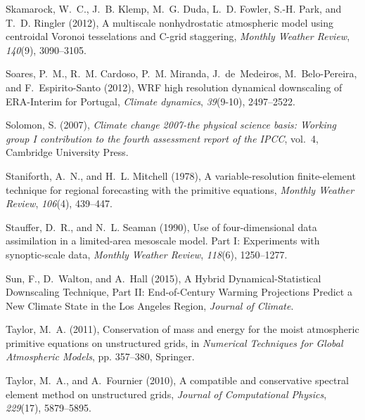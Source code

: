 \documentclass[ms]{agutex}   %
\begin{document}
\begin{article}
\begin{thebibliography}{84}
Skamarock, W.~C., J.~B. Klemp, M.~G. Duda, L.~D. Fowler, S.-H. Park, and T.~D.
  Ringler (2012), {A multiscale nonhydrostatic atmospheric model using
  centroidal Voronoi tesselations and C-grid staggering}, \textit{Monthly
  Weather Review}, \textit{140}(9), 3090--3105.

Soares, P.~M., R.~M. Cardoso, P.~M. Miranda, J.~de~Medeiros, M.~Belo-Pereira,
  and F.~Espirito-Santo (2012), {WRF high resolution dynamical downscaling of
  ERA-Interim for Portugal}, \textit{Climate dynamics}, \textit{39}(9-10),
  2497--2522.

Solomon, S. (2007), \textit{Climate change 2007-the physical science basis:
  Working group I contribution to the fourth assessment report of the IPCC},
  vol.~4, Cambridge University Press.

Staniforth, A.~N., and H.~L. Mitchell (1978), A variable-resolution
  finite-element technique for regional forecasting with the primitive
  equations, \textit{Monthly Weather Review}, \textit{106}(4), 439--447.

Stauffer, D.~R., and N.~L. Seaman (1990), {Use of four-dimensional data
  assimilation in a limited-area mesoscale model. Part I: Experiments with
  synoptic-scale data}, \textit{Monthly Weather Review}, \textit{118}(6),
  1250--1277.

Sun, F., D.~Walton, and A.~Hall (2015), {A Hybrid Dynamical-Statistical
  Downscaling Technique, Part II: End-of-Century Warming Projections Predict a
  New Climate State in the Los Angeles Region}, \textit{Journal of Climate}.

Taylor, M.~A. (2011), Conservation of mass and energy for the moist atmospheric
  primitive equations on unstructured grids, in \textit{Numerical Techniques
  for Global Atmospheric Models}, pp. 357--380, Springer.

Taylor, M.~A., and A.~Fournier (2010), A compatible and conservative spectral
  element method on unstructured grids, \textit{Journal of Computational
  Physics}, \textit{229}(17), 5879--5895.


\end{thebibliography}
\end{article}
\end{document}

